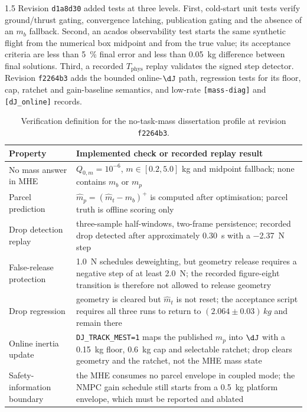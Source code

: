 \begin{spacing}{1.5}
Revision \texttt{d1a8d30} added tests at three levels. First, cold-start
unit tests verify ground/thrust gating, convergence latching, publication
gating and the absence of an $m_b$ fallback. Second, an acados
observability test starts the same synthetic flight from the numerical
box midpoint and from the true value; its acceptance criteria are less
than \SI{5}{\percent} final error and less than \SI{0.05}{kg}
difference between final solutions. Third, a recorded
$T_{\mathrm{phys}}$ replay validates the signed step detector. Revision
\texttt{f2264b3} adds the bounded online-$\dJ$ path, regression tests for
its floor, cap, ratchet and gain-baseline semantics, and low-rate
\texttt{[mass-diag]} and \texttt{[dJ\_online]} records.

\begin{table}[ht]
\centering
\caption{Verification definition for the no-task-mass dissertation profile at revision \texttt{f2264b3}.}
\label{tab:noprior-verification}
\begin{tabularx}{\textwidth}{@{}p{} X@{}}
\toprule
\textbf{Property} & \textbf{Implemented check or recorded replay result} \\
\midrule
No mass answer in MHE & $Q_{0,m}=10^{-6}$, $m\in[0.2,5.0]$ kg and midpoint fallback; none contains $m_b$ or $m_p$ \\
Parcel prediction & $\hat m_p=(\hat m_t-m_b)^+$ is computed after optimisation; parcel truth is offline scoring only \\
Drop detection replay & three-sample half-windows, two-frame persistence; recorded drop detected after approximately \SI{0.30}{s} with a \SI{-2.37}{N} step \\
False-release protection & \SI{1.0}{N} schedules deweighting, but geometry release requires a negative step of at least \SI{2.0}{N}; the recorded figure-eight transition is therefore not allowed to release geometry \\
Drop regression & geometry is cleared but $\hat m_t$ is not reset; the acceptance script requires all three runs to return to $(2.064\pm0.03)\,\si{kg}$ and remain there \\
Online inertia update & \texttt{DJ\_TRACK\_MEST=1} maps the published $\hat m_p$ into $\dJ$ with a \SI{0.15}{kg} floor, \SI{0.6}{kg} cap and selectable ratchet; drop clears geometry and the ratchet, not the MHE mass state \\
Safety-information boundary & the MHE consumes no parcel envelope in coupled mode; the NMPC gain schedule still starts from a \SI{0.5}{kg} platform envelope, which must be reported and ablated \\
\bottomrule
\end{tabularx}
\end{table}


\end{spacing}
